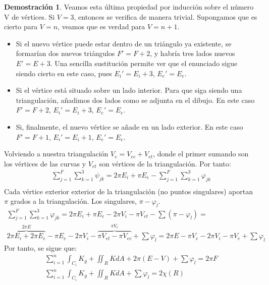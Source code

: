 \documentclass[twoside]{report}
\theoremstyle{definition}
\newtheorem*{dem}{Demostración}
\numberwithin{equation}{section}
\begin{document}
\begin{dem}
Veamos esta última propiedad por inducción sobre el número V de vértices. Si $V=3$, entonces se verifica de manera trivial. Supongamos que es cierto para $V=n$, veamos que es verdad para $V=n+1$. 
\begin{itemize}
\item Si el nuevo vértice puede estar dentro de un triángulo ya existente, se formarían dos nuevos triángulos $F' = F+2$, y habría tres lados nuevos $E'=E+3$. Una sencilla sustitución permite ver que el enunciado sigue siendo cierto en este caso, pues $E_i' = E_i+3$, $E_e'=E_e$.
\item Si el vértice está situado sobre un lado interior. Para que siga siendo una triangulación, añadimos dos lados como se adjunta en el dibujo. En este caso $F'=F+2$, $E_i'=E_i+3$, $E_e'=E_e$. 
\item Si, finalmente, el nuevo vértice se añade en un lado exterior. En este caso $F'=F+1$, $E_i'=E_i+1$, $E_e'=E_e$.
\end{itemize}
Volviendo a nuestra triangulación $V_e=V_{ec}+V_{et}$, donde el primer sumando son los vértices de las curvas y $V_{et}$ son vértices de la triangulación. Por tanto:
\begin{gather*}
\sum_{j=1}^F\sum_{k=1}^3 \psi_{jk} = 2\pi E_i + \pi E_e - \sum_{j=1}^F\sum_{k=1}^3 \varphi_{jk}\\
\end{gather*}
Cada vértice exterior exterior de la triangulación (no puntos singulares) aportan $\pi$ grados a la triangulación. Los singulares, $\pi - \varphi_l$.
\begin{gather*}
\sum_{j=1}^F\sum_{k=1}^3 \varphi_{jk} =  2\pi E_i + \pi E_e - 2\pi V_i-\pi V_{et} - \sum (\pi - \varphi_l) = \\
\overbrace{ 2\pi E_i + 2\pi E_e }^{2\pi E}- \pi E_e - 2\pi V_i-\overbrace{\pi V_{et}-\pi V_{ec}}^{\pi V_e}  +\sum \varphi_l  = 2\pi E - \pi V_e - 2\pi V_i - \pi V_e + \sum \varphi_l
\end{gather*}
Por tanto, se sigue que:
\begin{gather*}
\sum_{i=1}^n \int_{C_i}K_g + \iint_R K dA +   2\pi( E -V) + \sum \varphi_l = 2\pi F\\
\sum_{i=1}^n \int_{C_i}K_g + \iint_R K dA + \sum \varphi_l = 2 \chi(R)
\end{gather*}
\end{dem}
%
\end{document}

